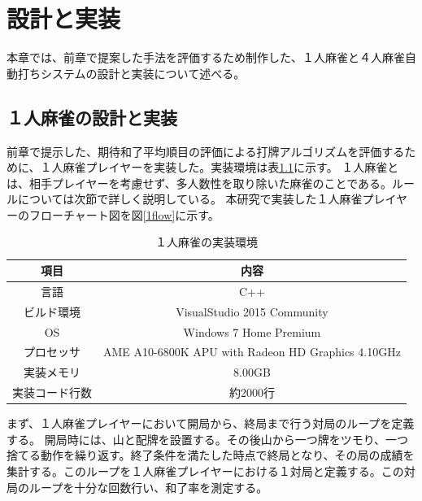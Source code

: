 \chapter{設計と実装}
\label{chap:implementation}

本章では、前章で提案した手法を評価するため制作した、１人麻雀と４人麻雀自動打ちシステムの設計と実装について述べる。

\section{１人麻雀の設計と実装}
前章で提示した、期待和了平均順目の評価による打牌アルゴリズムを評価するために、１人麻雀プレイヤーを実装した。実装環境は表\ref{imp2}に示す。
１人麻雀とは、相手プレイヤーを考慮せず、多人数性を取り除いた麻雀のことである。ルールについては次節で詳しく説明している。
本研究で実装した１人麻雀プレイヤーのフローチャート図を図\ref{1flow}に示す。

\begin{table}[h]
  \caption{１人麻雀の実装環境}
  \label{imp2}
  \begin{center}
  \begin{tabular}{c|c}
    \hline
    項目  & 内容 \\\hline\hline
    言語  & C++ \\\hline
    ビルド環境  & VisualStudio 2015 Community\\\hline
    OS & Windows 7 Home Premium \\\hline
    プロセッサ & AME A10-6800K APU with Radeon HD Graphics 4.10GHz\\\hline
    実装メモリ & 8.00GB\\\hline
    実装コード行数 & 約2000行
  \end{tabular}\end{center}
\end{table}

まず、１人麻雀プレイヤーにおいて開局から、終局まで行う対局のループを定義する。
開局時には、山と配牌を設置する。その後山から一つ牌をツモり、一つ捨てる動作を繰り返す。終了条件を満たした時点で終局となり、その局の成績を集計する。このループを１人麻雀プレイヤーにおける１対局と定義する。この対局のループを十分な回数行い、和了率を測定する。

